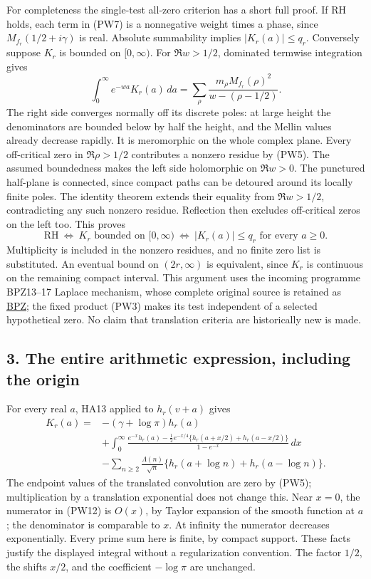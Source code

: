\documentclass[
  10pt,
  a4paper,
]{article}
\begin{document}
For completeness the single-test all-zero criterion has a short full
proof. If RH holds, each term in (PW7) is a nonnegative weight times a
phase, since \(M_{f_r}(1/2+i\gamma)\) is real. Absolute summability
implies \(|K_r(a)|\le q_r\). Conversely suppose \(K_r\) is bounded on
\([0,\infty)\). For \(\Re w>1/2\), dominated termwise integration gives
\[
 \int_0^\infty e^{-wa}K_r(a)\,da
 =\sum_\rho\frac{m_\rho M_{f_r}(\rho)^2}{w-(\rho-1/2)}.
\tag{PW10}
\] The right side converges normally off its discrete poles: at large
height the denominators are bounded below by half the height, and the
Mellin values already decrease rapidly. It is meromorphic on the whole
complex plane. Every off-critical zero in \(\Re\rho>1/2\) contributes a
nonzero residue by (PW5). The assumed boundedness makes the left side
holomorphic on \(\Re w>0\). The punctured half-plane is connected, since
compact paths can be detoured around its locally finite poles. The
identity theorem extends their equality from \(\Re w>1/2\),
contradicting any such nonzero residue. Reflection then excludes
off-critical zeros on the left too. This proves \[
 \boxed{\mathrm{RH}\ \Longleftrightarrow\ K_r\text{ bounded on }[0,\infty)
 \ \Longleftrightarrow\ |K_r(a)|\le q_r\text{ for every }a\ge0.}
\tag{PW11}
\] Multiplicity is included in the nonzero residues, and no finite zero
list is substituted. An eventual bound on \((2r,\infty)\) is equivalent,
since \(K_r\) is continuous on the remaining compact interval. This
argument uses the incoming programme BPZ13--17 Laplace mechanism, whose
complete original source is retained as
\href{BOUNDARY_PRIMITIVE_ALL_ZERO_RECEIVER.tex}{BPZ}; the fixed product
(PW3) makes its test independent of a selected hypothetical zero. No
claim that translation criteria are historically new is made.

\subsection{3. The entire arithmetic expression, including the
origin}\label{the-entire-arithmetic-expression-including-the-origin}

For every real \(a\), HA13 applied to \(h_r(v+a)\) gives \[
\begin{split}
 K_r(a)={}&-(\gamma+\log\pi)h_r(a)\\
 &+\int_0^\infty
 \frac{e^{-x}h_r(a)-\tfrac12e^{-x/4}
       \{h_r(a+x/2)+h_r(a-x/2)\}}{1-e^{-x}}\,dx\\
 &-\sum_{n\ge2}\frac{\Lambda(n)}{\sqrt n}
       \{h_r(a+\log n)+h_r(a-\log n)\}.
\end{split}
\tag{PW12}
\] The endpoint values of the translated convolution are zero by (PW5);
multiplication by a translation exponential does not change this. Near
\(x=0\), the numerator in (PW12) is \(O(x)\), by Taylor expansion of the
smooth function at \(a\); the denominator is comparable to \(x\). At
infinity the numerator decreases exponentially. Every prime sum here is
finite, by compact support. These facts justify the displayed integral
without a regularization convention. The factor \(1/2\), the shifts
\(x/2\), and the coefficient \(-\log\pi\) are unchanged.
\end{document}
